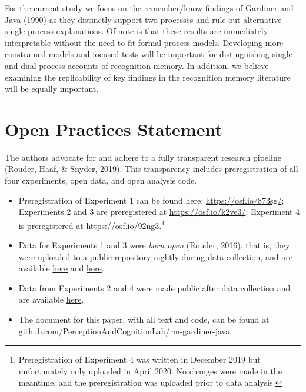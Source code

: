 \documentclass[english,,man,floatsintext]{apa6}
\begin{document}
For the current study we focus on the remember/know findings of Gardiner and Java (1990) as they distinctly support two processes and rule out alternative single-process explanations. Of note is that these results are immediately interpretable without the need to fit formal process models. Developing more constrained models and focused tests will be important for distinguishing single- and dual-process accounts of recognition memory. In addition, we believe examining the replicability of key findings in the recognition memory literature will be equally important.

\hypertarget{open-practices-statement}{%
\section{Open Practices Statement}\label{open-practices-statement}}

The authors advocate for and adhere to a fully transparent research pipeline (Rouder, Haaf, \& Snyder, 2019). This transparency includes preregistration of all four experiments, open data, and open analysis code.

\begin{itemize}
\item
  Preregistration of Experiment 1 can be found here: \url{https://osf.io/873sg/}; Experiments 2 and 3 are preregistered at \url{https://osf.io/k2ve3/}; Experiment 4 is preregistered at \url{https://osf.io/92ng3}.\footnote{Preregistration of Experiment 4 was written in December 2019 but unfortunately only uploaded in April 2020. No changes were made in the meantime, and the preregistration was uploaded prior to data analysis.}
\item
  Data for Experiments 1 and 3 were \emph{born open} (Rouder, 2016), that is, they were uploaded to a public repository nightly during data collection, and are available \href{https://github.com/PerceptionCognitionLab/data1/tree/master/repGardinerJava/RKN_replication/RKN_exp1}{here} and \href{https://github.com/PerceptionCognitionLab/data1/tree/master/repGardinerJava/exp2/RKN_replication/RKN_exp2/SU}{here}.
\item
  Data from Experiments 2 and 4 were made public after data collection and are available \href{https://github.com/PerceptionCognitionLab/data0/tree/master/rm-gardiner-java}{here}.
\item
  The document for this paper, with all text and code, can be found at \href{https://github.com/PerceptionAndCognitionLab/rm-gardiner-java/tree/public/papers/current}{github.com/PerceptionAndCognitionLab/rm-gardiner-java}.
\end{itemize}
\end{document}
